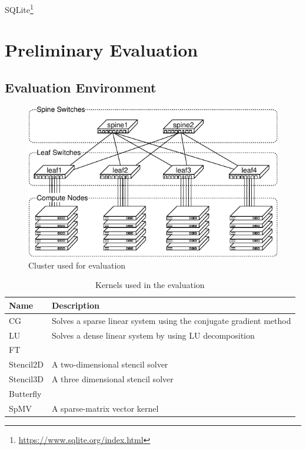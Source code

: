 \documentclass[graybox]{svmult}
\begin{document}
SQLite\footnote{\url{https://www.sqlite.org/index.html}}

\section{Preliminary Evaluation}\label{kt:sec:iv}

\subsection{Evaluation Environment}

\begin{figure}
    \centering
    \includegraphics{evaluation_cluster}
    \caption{Cluster used for evaluation}%
    \label{kt:fig:cluster}
\end{figure}

\begin{table}[]
\caption{Kernels used in the evaluation}%
\label{kt:tbl:openflow-messages}
\begin{tabular}{ll}
\toprule
Name      & Description \\ \midrule
CG        & Solves a sparse linear system using the conjugate gradient method \\
LU        & Solves a dense linear system by using LU decomposition            \\
FT        &             \\
Stencil2D & A two-dimensional stencil solver           \\
Stencil3D & A three dimensional stencil solver            \\
Butterfly &             \\
SpMV      & A sparse-matrix vector kernel            \\ \bottomrule
\end{tabular}
\end{table}
\end{document}
